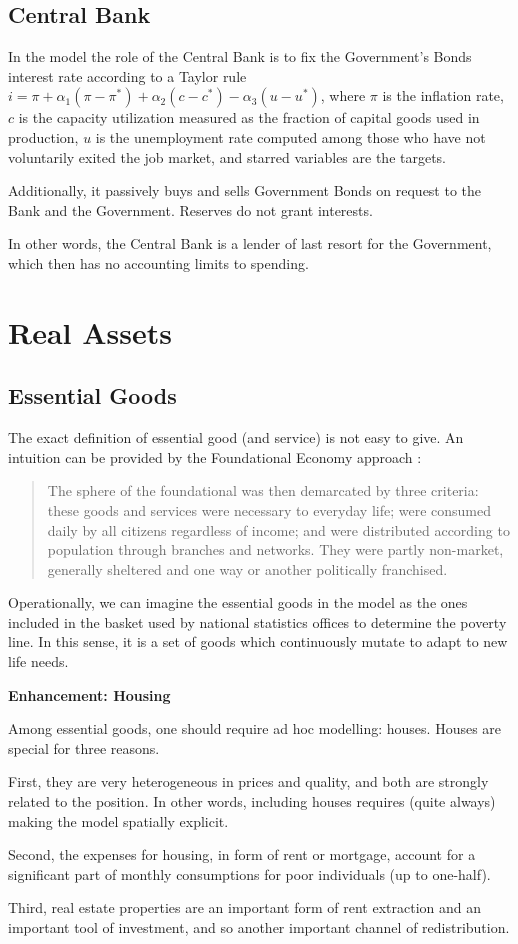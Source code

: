 \documentclass[a4paper, headings=standardclasses]{scrartcl}
\newenvironment{enh}[1][]{\begin{framed}\noindent\textbf{Enhancement: #1}\par}{\end{framed}}
\begin{document}
\subsection{Central Bank}
In the model the role of the Central Bank is to fix the Government's Bonds interest rate according to a Taylor rule $i = \pi + \alpha_1 (\pi - \pi^*) + \alpha_2 (c - c^*) - \alpha_3 (u - u^*)$, where $\pi$ is the inflation rate, $c$ is the capacity utilization measured as the fraction of capital goods used in production, $u$ is the unemployment rate computed among those who have not voluntarily exited the job market, and starred variables are the targets.

Additionally, it passively buys and sells Government Bonds on request to the Bank and the Government. Reserves do not grant interests.

In other words, the Central Bank is a lender of last resort for the Government, which then has no accounting limits to spending.

\section{Real Assets}
\subsection{Essential Goods}
The exact definition of essential good (and service) is not easy to give. An intuition can be provided by the Foundational Economy approach \parencite{arcidiacono2018}: \begin{quote}
	The sphere of the foundational was then demarcated by three criteria: these goods and services were necessary to everyday life; were consumed daily by all citizens regardless of income; and were distributed according to population through branches and networks. They were partly non-market, generally sheltered and one way or another politically franchised.
\end{quote}

Operationally, we can imagine the essential goods in the model as the ones included in the basket used by national statistics offices to determine the poverty line. In this sense, it is a set of goods which continuously mutate to adapt to new life needs.

\begin{enh}[Housing]
	Among essential goods, one should require ad hoc modelling: houses. Houses are special for three reasons.

	First, they are very heterogeneous in prices and quality, and both are strongly related to the position. In other words, including houses requires (quite always) making the model spatially explicit.

	Second, the expenses for housing, in form of rent or mortgage, account for a significant part of monthly consumptions for poor individuals (up to one-half).

	Third, real estate properties are an important form of rent extraction and an important tool of investment, and so another important channel of redistribution.
\end{enh}
\end{document}
